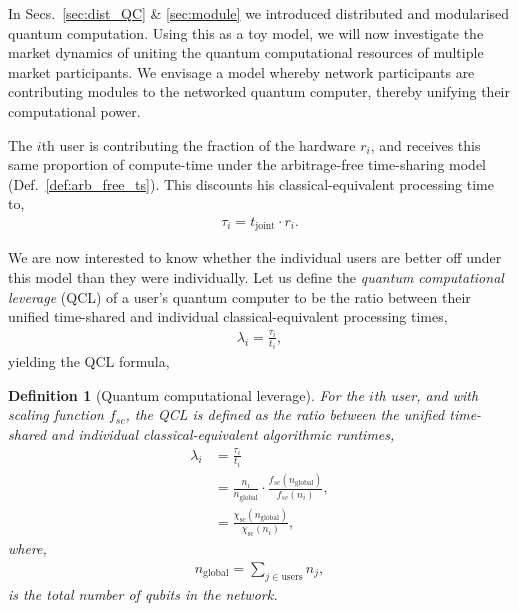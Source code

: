 \documentclass[aps, rmp, twocolumn, amsmath, amssymb, nofootinbib, superscriptaddress, longbibliography, floatfix, table-of-contents, eqsecnum]{revtex4-1}
\newtheorem{definition}{Definition}
\begin{document}
In Secs.~\ref{sec:dist_QC} \& \ref{sec:module} we introduced distributed and modularised quantum computation. Using this as a toy model, we will now investigate the market dynamics of uniting the quantum computational resources of multiple market participants. We envisage a model whereby network participants are contributing modules to the networked quantum computer, thereby unifying their computational power.

The $i$th user is contributing the fraction of the hardware $r_i$, and receives this same proportion of compute-time under the arbitrage-free time-sharing model (Def.~\ref{def:arb_free_ts}). This discounts his classical-equivalent processing time to,
\begin{align}
\tau_i = t_\text{joint} \cdot r_i.
\end{align}

We are now interested to know whether the individual users are better off under this model than they were individually. Let us define the \textit{quantum computational leverage} (QCL) of a user's quantum computer to be the ratio between their unified time-shared and individual classical-equivalent processing times,
\begin{align}
\lambda_i = \frac{\tau_i}{t_i},
\end{align}
yielding the QCL formula,

\begin{definition}[Quantum computational leverage] \label{def:quant_econ_lev}
For the $i$th user, and with scaling function $f_{sc}$, the QCL is defined as the ratio between the unified time-shared and individual classical-equivalent algorithmic runtimes,
\begin{align}
\lambda_i &= \frac{\tau_i}{t_i} \nonumber \\
&= \frac{n_i}{n_\text{global}} \cdot \frac{f_{sc}(n_\text{global})}{f_{sc}(n_i)}, \nonumber \\
&= \frac{\chi_\text{sc}(n_\text{global})}{\chi_\text{sc}(n_i)},
\end{align}
where,
\begin{align}
	n_\text{global} = \sum_{j\in \text{users}} n_j,
\end{align}
is the total number of qubits in the network.
\end{definition}
\end{document}
